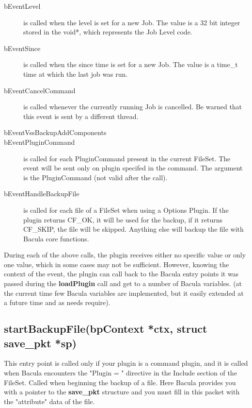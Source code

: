 \begin{description}
 \item [bEventLevel] is called when the level is set for a new Job. The value
   is a 32 bit integer stored in the void*, which represents the Job Level code.

 \item [bEventSince] is called when the since time is set for a new Job. The 
   value is a time\_t time at which the last job was run.

\item [bEventCancelCommand] is called whenever the currently
  running Job is cancelled. Be warned that this event is sent by a different
  thread.

\item [bEventVssBackupAddComponents] 

\item [bEventPluginCommand] is called for each PluginCommand present in the
  current FileSet.  The event will be sent only on plugin specifed in the
  command.  The argument is the PluginCommand (not valid after the call).

\item [bEventHandleBackupFile] is called for each file of a FileSet when
  using a Options Plugin.  If the plugin returns CF\_OK, it will be used
  for the backup, if it returns CF\_SKIP, the file will be skipped.
  Anything else will backup the file with Bacula core functions.
\end{description}

During each of the above calls, the plugin receives either no specific value or
only one value, which in some cases may not be sufficient.  However, knowing
the context of the event, the plugin can call back to the Bacula entry points
it was passed during the {\bf loadPlugin} call and get to a number of Bacula
variables.  (at the current time few Bacula variables are implemented, but it
easily extended at a future time and as needs require).

\subsection{startBackupFile(bpContext *ctx, struct save\_pkt *sp)}
This entry point is called only if your plugin is a command plugin, and 
it is called when Bacula encounters the "Plugin = " directive in
the Include section of the FileSet.
Called when beginning the backup of a file. Here Bacula provides you
with a pointer to the {\bf save\_pkt} structure and you must fill in 
this packet with the "attribute" data of the file.

